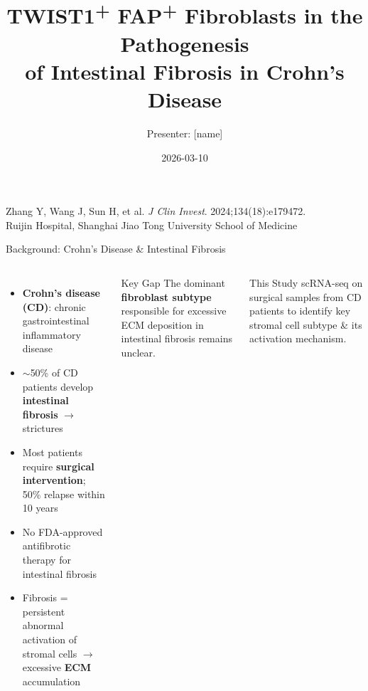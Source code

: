 \documentclass[aspectratio=169,10pt]{beamer}
\title{TWIST1\textsuperscript{+} FAP\textsuperscript{+} Fibroblasts in the Pathogenesis\\of Intestinal Fibrosis in Crohn's Disease}
\author{Presenter: [name]}
\institute{Shanghai Jiao Tong University}
\date{2026-03-10}
\newcommand{\con}[1]{\textcolor{negative}{#1}}
\begin{document}
\begin{frame}[plain]
\titlepage
\vfill
{\small Zhang Y, Wang J, Sun H, et al. \textit{J Clin Invest}. 2024;134(18):e179472.\\
Ruijin Hospital, Shanghai Jiao Tong University School of Medicine}
\end{frame}

\begin{frame}{Background: Crohn's Disease \& Intestinal Fibrosis}
\begin{columns}[T]
\begin{itemize}
  \item \textbf{Crohn's disease (CD)}: chronic gastrointestinal inflammatory disease
  \item \con{$\sim$50\% of CD patients} develop \textbf{intestinal fibrosis} $\rightarrow$ strictures
  \item Most patients require \textbf{surgical intervention}; 50\% relapse within 10 years
  \item \con{No FDA-approved antifibrotic therapy} for intestinal fibrosis
  \item Fibrosis = persistent abnormal activation of stromal cells $\rightarrow$ excessive \textbf{ECM} accumulation
\end{itemize}

\begin{alertblock}{Key Gap}
The dominant \textbf{fibroblast subtype} responsible for excessive ECM deposition in intestinal fibrosis remains \con{unclear}.
\end{alertblock}
\vspace{6pt}
\begin{exampleblock}{This Study}
scRNA-seq on surgical samples from CD patients to identify key stromal cell subtype \& its activation mechanism.
\end{exampleblock}
\end{columns}
\end{frame}
\end{document}
